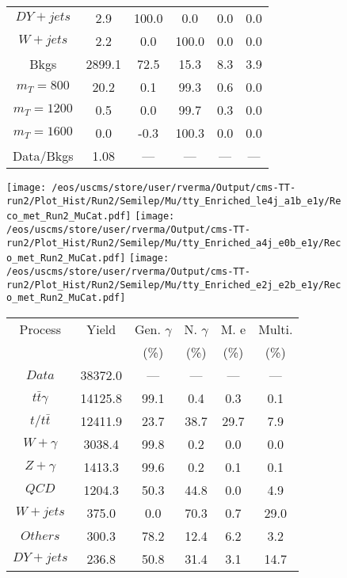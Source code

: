 \begin{figure}
\begin{minipage}[c]{0.32\textwidth}
{\begin{tabular}{cccccc}
$ DY+jets $ &  2.9 &  100.0 &  0.0 &  0.0 &  0.0\\
$ W+jets $ &  2.2 &  0.0 &  100.0 &  0.0 &  0.0\\
Bkgs &  2899.1 &  72.5 &  15.3 &  8.3 &  3.9\\
$ m_{T} = 800 $ &  20.2 &  0.1 &  99.3 &  0.6 &  0.0\\
$ m_{T} = 1200 $ &  0.5 &  0.0 &  99.7 &  0.3 &  0.0\\
$ m_{T} = 1600 $ &  0.0 &  -0.3 &  100.3 &  0.0 &  0.0\\
Data/Bkgs &  1.08 &  --- &  --- &  --- &  ---\\
\hline
\end{tabular}
}
\end{minipage}
\end{figure}

\begin{figure}
\centering
\texttt{[image: /eos/uscms/store/user/rverma/Output/cms-TT-run2/Plot\_Hist/Run2/Semilep/Mu/tty\_Enriched\_le4j\_a1b\_e1y/Reco\_met\_Run2\_MuCat.pdf]}
\texttt{[image: /eos/uscms/store/user/rverma/Output/cms-TT-run2/Plot\_Hist/Run2/Semilep/Mu/tty\_Enriched\_a4j\_e0b\_e1y/Reco\_met\_Run2\_MuCat.pdf]}
\texttt{[image: /eos/uscms/store/user/rverma/Output/cms-TT-run2/Plot\_Hist/Run2/Semilep/Mu/tty\_Enriched\_e2j\_e2b\_e1y/Reco\_met\_Run2\_MuCat.pdf]}
\begin{minipage}[c]{0.32\textwidth}
\centering
\tiny{
\begin{tabular}{cccccc}
\hline
Process & Yield & Gen. $\gamma$ & N. $\gamma$ & M. e & Multi. \\
 &  & (\%) & (\%) & (\%) & (\%)  \\
\hline
                                                                      $ Data $ &  38372.0 &  --- &  --- &  --- &  ---\\
$ t\bar{t}\gamma $ &  14125.8 &  99.1 &  0.4 &  0.3 &  0.1\\
$ t/t\bar{t} $ &  12411.9 &  23.7 &  38.7 &  29.7 &  7.9\\
$ W+\gamma $ &  3038.4 &  99.8 &  0.2 &  0.0 &  0.0\\
$ Z+\gamma $ &  1413.3 &  99.6 &  0.2 &  0.1 &  0.1\\
$ QCD $ &  1204.3 &  50.3 &  44.8 &  0.0 &  4.9\\
$ W+jets $ &  375.0 &  0.0 &  70.3 &  0.7 &  29.0\\
$ Others $ &  300.3 &  78.2 &  12.4 &  6.2 &  3.2\\
$ DY+jets $ &  236.8 &  50.8 &  31.4 &  3.1 &  14.7\\

\end{tabular}}
\end{minipage}
\end{figure}

